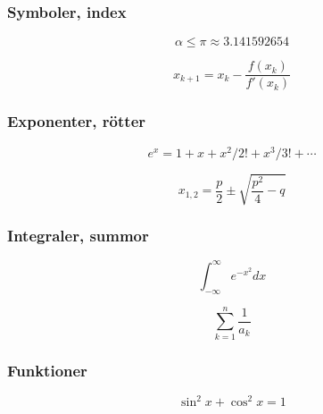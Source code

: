 \begin{frame}[fragile,t]
  \frametitle{Symboler, index}
  \vspace{2em}

  \begin{exlatex}
\begin{displaymath}
  \alpha \leq \pi \approx 3.141592654
\end{displaymath}
  \end{exlatex}

  \vspace{1cm}

  \begin{exlatex}
\[
  x_{k+1} =
  x_{k} -
  \frac{f(x_{k})}{f'(x_{k})}
\]
  \end{exlatex}
\end{frame}

\begin{frame}[fragile,t]
  \frametitle{Exponenter, rötter}
  \vspace{2em}

  \begin{exlatex}
\[
  e^x = 1+x+x^2/2!+x^3/3!+\cdots
\]
  \end{exlatex}

  \vspace{1cm}

  \begin{exlatex}
\[
  x_{1,2}=\frac{p}{2}\pm
  \sqrt{\frac{p^2}{4}-q}
\]
  \end{exlatex}

\end{frame}



\begin{frame}[fragile,t]
  \frametitle{Integraler, summor}
  \vspace{2em}

  \begin{exlatex}
\[
  \int_{-\infty}^{\infty}
  e^{-x^2} dx
\]
  \end{exlatex}

  \vspace{1cm}

  \begin{exlatex}
\[
  \sum_{k=1}^n\frac{1}{a_k}
\]
  \end{exlatex}

\end{frame}

\begin{frame}[fragile,t]
  \frametitle{Funktioner}
  \vspace{2em}

  \begin{exlatex}
\[
  \sin^2 x + \cos^2 x = 1
\]
  \end{exlatex}
\end{frame}


